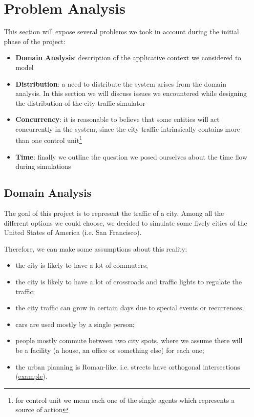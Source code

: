 \section{Problem Analysis}

This section will expose several problems we took in account during the
initial phase of the project:

\begin{itemize}
\item \textbf{Domain Analysis}: description of the applicative context we
  considered to model
\item \textbf{Distribution}: a need to distribute the system arises from the
  domain analysis. In this section we will discuss issues we encountered while
  designing the distribution of the city traffic simulator
\item \textbf{Concurrency}: it is reasonable to believe that some entities
  will act concurrently in the system, since the city traffic intrinsically
  contains more than one control unit\footnote{for control unit we mean each
  one of the single agents which represents a source of action}
\item \textbf{Time}: finally we outline the question we posed ourselves about
  the time flow during simulations
\end{itemize}


\subsection{Domain Analysis}\label{sec:pa-domain}
The goal of this project is to represent the traffic of a city. Among all the
different options we could choose, we decided to simulate some lively cities of
the United States of America (i.e. San Francisco).

Therefore, we can make some assumptions about this reality:

\begin{itemize}
\item the city is likely to have a lot of commuters;
\item the city is likely to have a lot of crossroads and
traffic lights to regulate the traffic;
\item the city traffic can grow in certain days due to special events or
  recurrences;
\item cars are used mostly by a single person;
\item people mostly commute between two city spots, where we assume there
  will be a facility (a house, an office or something else) for each one;
\item the urban planning is Roman-like, i.e. streets have orthogonal
  intersections (\href{https://www.google.it/maps/place/San+Francisco,+California,+Stati+Uniti/@37.7766566,-122.4330836,16z/data=!4m2!3m1!1s0x80859a6d00690021:0x4a501367f076adff}{example}).
\end{itemize}

